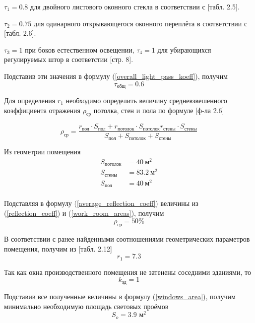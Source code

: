 $\tau_1 = 0.8$ для двойного листового оконного стекла в соответствии с
\cite{lighting_calc_method}[табл. 2.5].

$\tau_2 = 0.75$ для одинарного открывающегося оконного переплёта в соответствии с
\cite{lighting_calc_method}[табл. 2.6].

$\tau_3 = 1$ при боков естественном освещении, $\tau_4 = 1$ для убирающихся
регулируемых штор  в соответстии \cite{lighting_calc_method}[стр. 8].

Подставив эти значения в формулу (\ref{overall_light_pass_koeff}), получим
$$
    \tau_\text{общ} = 0.6
$$

Для определения $r_1$ необходимо определить величину средневзвешенного коэффициента
отражения $\rho_\text{ср}$ потолка, стен и пола по формуле
\cite{lighting_calc_method}[ф-ла 2.6]

\begin{equation}
    \rho_\text{ср} = \frac{ r_\text{пол} \cdot S_\text{пол}
                            + r_\text{потолок} \cdot S_\text{потолок}
                            r_\text{стены} \cdot S_\text{стены}}
                            {S_\text{пол} + S_\text{потолок} + S_\text{стены}}
    \label{average_reflection_coeff}
\end{equation}

Из геометрии помещения
\begin{equation}
    \begin{array}{ll}
        S_\text{потолок}    & = 40 ~\text{м}^2      \\
        S_\text{стены}      & = 83.2 ~\text{м}^2    \\
        S_\text{пол}        & = 40 ~\text{м}^2      \\
    \end{array}
    \label{work_room_areas}
\end{equation}

Подставляя в формулу (\ref{average_reflection_coeff}) величины из (\ref{reflection_coeff})
и (\ref{work_room_areas}), получим
$$
    \rho_\text{ср} = 50 \%
$$

В соответствии с ранее найденными соотношениями геометрических параметров помещения,
получим из \cite{lighting_calc_method}[табл. 2.12]
$$
    r_1 = 7.3
$$

Так как окна производственного помещения не затенены соседними зданиями, то
$$
    k_\text{зд} = 1
$$

Подставив все полученные величины в формулу (\ref{windows_area}), получим
минимально необходимую площадь световых проёмов
$$
    S_o = 3.9 \text{ м}^2
$$

